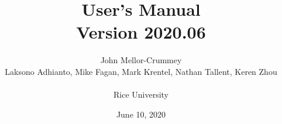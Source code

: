 \documentclass[11pt,letterpaper]{report}
\begin{document}

\title{\HPCToolkit{} User's Manual\\[.5in]Version 2020.06}

\author{
John Mellor-Crummey\\
Laksono Adhianto,
Mike Fagan,
Mark Krentel,
Nathan Tallent, Keren Zhou\\
\\
Rice University\\
}

\date{June 10, 2020}

\maketitle



\setcounter{page}{1}







\begin{singlespace}

\newpage

\pagestyle{empty}
\thispagestyle{empty}
\tableofcontents



\end{singlespace}
\end{document}
